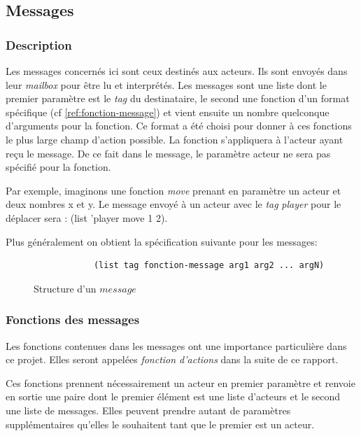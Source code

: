 \documentclass{article}
\begin{document}
\subsection{Messages}

\subsubsection{Description}

Les messages concernés ici sont ceux destinés aux acteurs. Ils sont envoyés dans leur \textit{mailbox} pour être lu et interprétés. Les messages sont une liste dont le premier paramètre est le \textit{tag} du destinataire, le second une fonction d'un format spécifique (cf \ref{ref:fonction-message}) et vient ensuite un nombre quelconque d'arguments pour la fonction. Ce format a été choisi pour donner à ces fonctions le plus large champ d'action possible. La fonction s'appliquera à l'acteur ayant reçu le message. De ce fait dans le message, le paramètre acteur ne sera pas spécifié pour la fonction. 

Par exemple, imaginons une fonction \textit{move} prenant en paramètre un acteur et deux nombres x et y. Le message envoyé à un acteur avec le \textit{tag} \textit{player} pour le déplacer sera : (list 'player move 1 2).

Plus généralement on obtient la spécification suivante pour les messages:

\begin{figure}[h]
      \centering
        \begin{verbatim}
            (list tag fonction-message arg1 arg2 ... argN)
        \end{verbatim}
      \caption{Structure d'un $message$}
      \label{fig:struct-message}
  \end{figure}

\subsubsection{\label{ref:fonction-message} Fonctions des messages}

Les fonctions contenues dans les messages ont une importance particulière dans ce projet. Elles seront appelées \textit{fonction d'actions} dans la suite de ce rapport.

Ces fonctions prennent nécessairement un acteur en premier paramètre et renvoie en sortie une paire dont le premier élément est une liste d'acteurs et le second une liste de messages. Elles peuvent prendre autant de paramètres supplémentaires qu'elles le souhaitent tant que le premier est un acteur.
\end{document}
